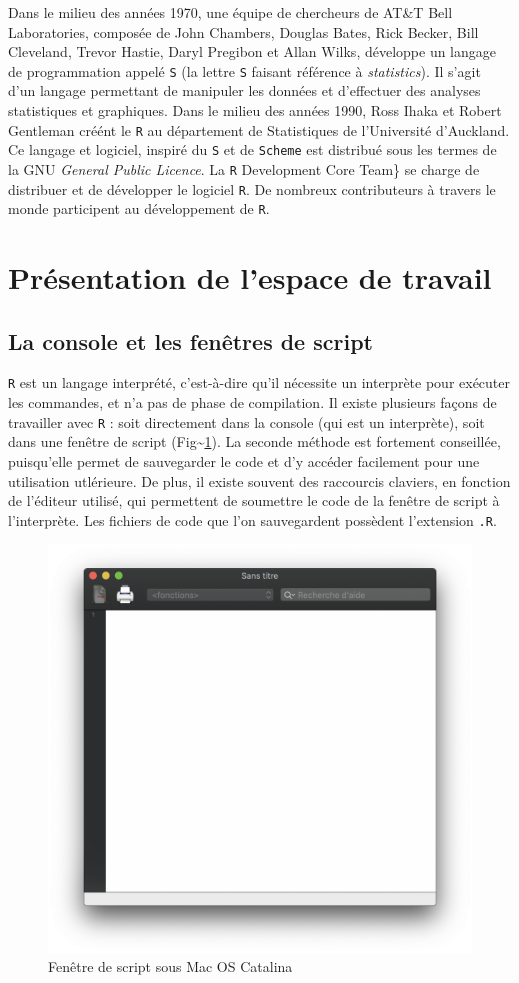 \documentclass[
  11pt,
]{book}
\numberwithin{equation}{section}
\numberwithin{countremarque}{section}
\begin{document}
Dans le milieu des années 1970, une équipe de chercheurs de AT\&T Bell Laboratories, composée de John Chambers, Douglas Bates, Rick Becker, Bill Cleveland, Trevor Hastie, Daryl Pregibon et Allan Wilks, développe un langage de programmation appelé \texttt{S} (la lettre \texttt{S} faisant référence à \emph{statistics}). Il s'agit d'un langage permettant de manipuler les données et d'effectuer des analyses statistiques et graphiques. Dans le milieu des années 1990, Ross Ihaka et Robert Gentleman créént le \texttt{R} au département de Statistiques de l'Université d'Auckland. Ce langage et logiciel, inspiré du \texttt{S} et de \texttt{Scheme} est distribué sous les termes de la GNU \emph{General Public Licence}. La \texttt{R} Development Core Team\} se charge de distribuer et de développer le logiciel \texttt{R}. De nombreux contributeurs à travers le monde participent au développement de \texttt{R}.

\hypertarget{pruxe9sentation-de-lespace-de-travail}{%
\section{Présentation de l'espace de travail}\label{pruxe9sentation-de-lespace-de-travail}}

\hypertarget{la-console-et-les-fenuxeatres-de-script}{%
\subsection{La console et les fenêtres de script}\label{la-console-et-les-fenuxeatres-de-script}}

\texttt{R} est un langage interprété, c'est-à-dire qu'il nécessite un interprète pour exécuter les commandes, et n'a pas de phase de compilation. Il existe plusieurs façons de travailler avec \texttt{R} : soit directement dans la console (qui est un interprète), soit dans une fenêtre de script (Fig\textasciitilde\ref{fig:intro-script}). La seconde méthode est fortement conseillée, puisqu'elle permet de sauvegarder le code et d'y accéder facilement pour une utilisation utlérieure. De plus, il existe souvent des raccourcis claviers, en fonction de l'éditeur utilisé, qui permettent de soumettre le code de la fenêtre de script à l'interprète. Les fichiers de code que l'on sauvegardent possèdent l'extension \texttt{.R}.

\begin{figure}[H]

{\centering \includegraphics[width=0.4\linewidth]{figs/fenetre_script} 

}

\caption{Fenêtre de script sous Mac OS Catalina}\label{fig:intro-script}
\end{figure}
\end{document}
